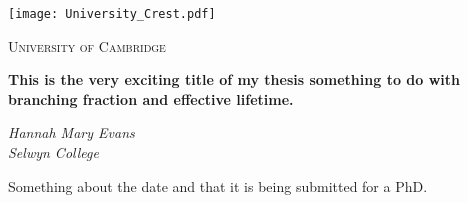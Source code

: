 \begin{titlepage}
  \centering
  \texttt{[image: University\_Crest.pdf]}\par\vspace{1cm}
  {\scshape\LARGE  University of Cambridge \par}
  \vspace{1cm}
  \vspace{1.5cm}
  {\LARGE\bfseries This is the very exciting title of my thesis something to do with \bsmumu branching fraction and effective lifetime.\par}
  \vspace{2cm}
  {\Large\itshape Hannah Mary Evans\\
    Selwyn College\par}
  \vfill
  {\large
  }
  \vfill

  {\large Something about the date and that it is being submitted for a PhD.}
\end{titlepage}
